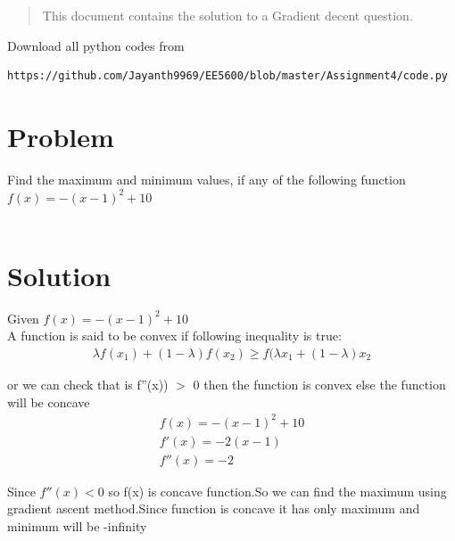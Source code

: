 \begin{enumerate}[label=\thesection.\arabic*.,ref=\thesection.\theenumi]

\begin{abstract}
This document contains the solution to a Gradient decent question.\\
\end{abstract}
Download all python codes from 
%
\begin{lstlisting}
https://github.com/Jayanth9969/EE5600/blob/master/Assignment4/code.py
\end{lstlisting}

\section{Problem}
    Find the maximum and minimum values, if any of the following function \\
    $f(x) = -(x-1)^2+10$ \\ \\
    
\section{Solution}

    Given $f(x) = -(x-1)^2+10$ \\
    A function is said to be convex if following inequality is true:
    \begin{align}
        \lambda f(x_1)+(1-\lambda) f(x_2) \geq f(\lambda x_1+(1-\lambda) x_2
    \end{align}
    
    or we can check that is f''(x)) $>$ 0 then the function is convex else the function will be concave  \\
    
    \begin{align}
        f(x) = -(x-1)^2+10 \\
        f'(x) = -2(x-1) \\
        f''(x) = -2 
    \end{align}
    
    Since $f''(x) < 0$ so f(x) is concave function.So we can find the maximum using gradient ascent method.Since function is concave it has only maximum and minimum will be -infinity \\
    

\end{enumerate}
